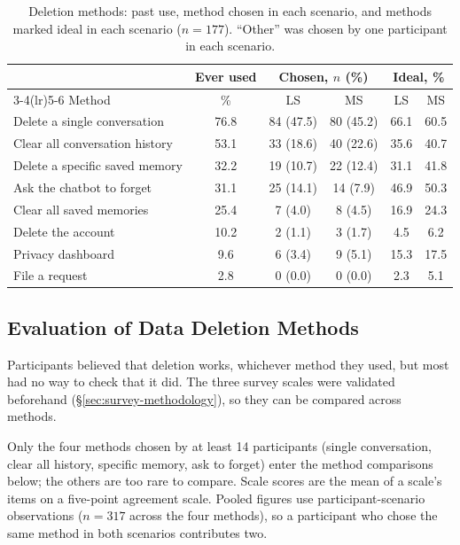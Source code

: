 \documentclass[conference,compsoc]{IEEEtran}
\begin{document}
\begin{table}[t]
\centering
\caption{Deletion methods: past use, method chosen in each scenario, and methods marked ideal in each scenario ($n=177$). ``Other'' was chosen by one participant in each scenario.}
\label{tab:method-usage}
\small
\begin{tabular}{lccccc}
\toprule
 & Ever used & \multicolumn{2}{c}{Chosen, $n$ (\%)} & \multicolumn{2}{c}{Ideal, \%} \\
\cmidrule(lr){3-4}\cmidrule(lr){5-6}
Method & \% & LS & MS & LS & MS \\
\midrule
Delete a single conversation & 76.8 & 84 (47.5) & 80 (45.2) & 66.1 & 60.5 \\
Clear all conversation history & 53.1 & 33 (18.6) & 40 (22.6) & 35.6 & 40.7 \\
Delete a specific saved memory & 32.2 & 19 (10.7) & 22 (12.4) & 31.1 & 41.8 \\
Ask the chatbot to forget & 31.1 & 25 (14.1) & 14 (7.9) & 46.9 & 50.3 \\
Clear all saved memories & 25.4 & 7 (4.0) & 8 (4.5) & 16.9 & 24.3 \\
Delete the account & 10.2 & 2 (1.1) & 3 (1.7) & 4.5 & 6.2 \\
Privacy dashboard & 9.6 & 6 (3.4) & 9 (5.1) & 15.3 & 17.5 \\
File a request & 2.8 & 0 (0.0) & 0 (0.0) & 2.3 & 5.1 \\
\bottomrule
\end{tabular}
\end{table}

\subsection{Evaluation of Data Deletion Methods}

Participants believed that deletion works, whichever method they used, but most had no way to check that it did. The three survey scales were validated beforehand (\S\ref{sec:survey-methodology}), so they can be compared across methods.

Only the four methods chosen by at least 14 participants (single conversation, clear all history, specific memory, ask to forget) enter the method comparisons below; the others are too rare to compare. Scale scores are the mean of a scale's items on a five-point agreement scale. Pooled figures use participant-scenario observations ($n=317$ across the four methods), so a participant who chose the same method in both scenarios contributes two.
\end{document}
